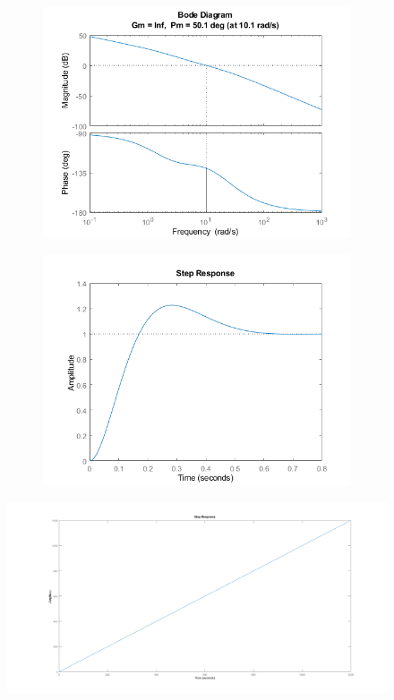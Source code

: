 \documentclass{layout}
\begin{document}
\begin{figure}[H]
    \centering
    \begin{subfigure}[b]{0.49\textwidth}
        \centering
        \includegraphics[width=\textwidth]{images/figure3.png}
    \end{subfigure}
    \hfill
    \begin{subfigure}[b]{0.49\textwidth}
        \centering
        \includegraphics[width=\textwidth]{images/figure4.png}
    \end{subfigure}
\end{figure}

\begin{figure}[H]
    \centering 
 	\includegraphics[width=\textwidth]{images/figure5.png}
\end{figure}
\end{document}
